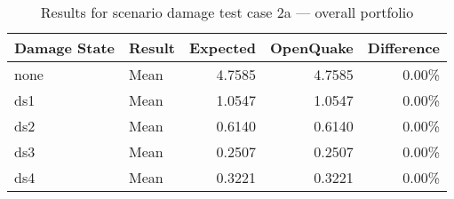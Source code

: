 \begin{table}[htbp]

\centering
\begin{tabular}{ l l r r r }

\hline
\rowcolor{anti-flashwhite}
\bf{Damage State} & \bf{Result} & \bf{Expected} & \bf{OpenQuake} & \bf{Difference}\\
\hline
none & Mean & 4.7585 & 4.7585 & 0.00\% \\
 ds1 & Mean & 1.0547 & 1.0547 & 0.00\% \\
 ds2 & Mean & 0.6140 & 0.6140 & 0.00\% \\
 ds3 & Mean & 0.2507 & 0.2507 & 0.00\% \\
 ds4 & Mean & 0.3221 & 0.3221 & 0.00\% \\
\hline
\end{tabular}

\caption{Results for scenario damage test case 2a — overall portfolio}
\label{tab:result-sd-2b-total}
\end{table}